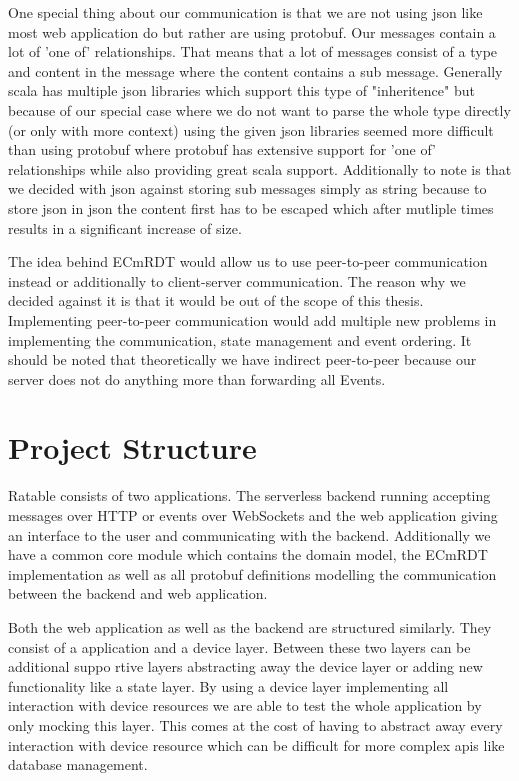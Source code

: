 \documentclass[
	ngerman,
	ruledheaders=section,   %
	class=report,		    %
	thesis={type=bachelor}, %
	accentcolor=9c,			%
	custommargins=true,    %
	marginpar=false,        %
	parskip=half-,          %
	fontsize=11pt,          %
]{tudapub}
\begin{document}
One special thing about our communication is that we are not using json like most web application do but rather are using protobuf. Our messages contain a lot of 'one of' relationships. That means that a lot of messages consist of a type and content in the message where the content contains a sub message. Generally scala has multiple json libraries which support this type of "inheritence" but because of our special case where we do not want to parse the whole type directly (or only with more context) using the given json libraries seemed more difficult than using protobuf where protobuf has extensive support for 'one of' relationships while also providing great scala support. Additionally to note is that we decided with json against storing sub messages simply as string because to store json in json the content first has to be escaped which after mutliple times results in a significant increase of size.

The idea behind ECmRDT would allow us to use peer-to-peer communication instead or additionally to client-server communication. The reason why we decided against it is that it would be out of the scope of this thesis. Implementing peer-to-peer communication would add multiple new problems in implementing the communication, state management and event ordering. It should be noted that theoretically we have indirect peer-to-peer because our server does not do anything more than forwarding all Events.

\section{Project Structure}
Ratable consists of two applications. The serverless backend running accepting messages over HTTP or events over WebSockets and the web application giving an interface to the user and communicating with the backend. Additionally we have a common core module which contains the domain model, the ECmRDT implementation as well as all protobuf definitions modelling the communication between the backend and web application.

Both the web application as well as the backend are structured similarly. They consist of a application and a device layer. Between these two layers can be additional suppo
rtive layers abstracting away the device layer or adding new functionality like a state layer. By using a device layer implementing all interaction with device resources we are able to test the whole application by only mocking this layer. This comes at the cost of having to abstract away every interaction with device resource which can be difficult for more complex apis like database management. 
\end{document}
